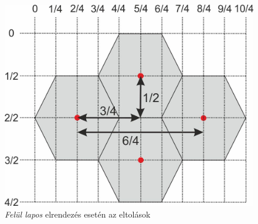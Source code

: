 \begin{figure}[h!]
\centering
\includegraphics[scale=1.0]{kepek/FlatTop.jpg}
\caption{\textit{Felül lapos} elrendezés esetén az eltolások}
\label{fig:FlatTop}
\end{figure}


